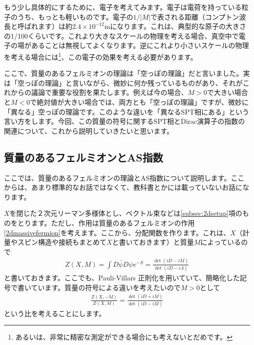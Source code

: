 \documentclass[paper=a4, fontsize=12pt, line_length=16cm, number_of_lines=33,dvipdfmx]{jlreq}
\numberwithin{equation}{section}
\newcommand{\psib}{\bar{\psi}}
\begin{document}
もう少し具体的にするために、電子を考えてみます。電子は電荷を持っている粒子のうち、もっとも軽いものです。電子の$1/|M|$で表される距離（コンプトン波長と呼ばれます）は約$2.4\times 10^{-12}$mになります。これは、典型的な原子の大きさの1/100くらいです。これより大きなスケールの物理を考える場合、真空中で電子の場があることは無視してよくなります。逆にこれより小さいスケールの物理を考える場合には\footnote{あるいは、非常に精密な測定ができる場合にも考えないとだめです。}、この電子の効果を考える必要があります。

ここで、質量のあるフェルミオンの理論は「空っぽの理論」だと言いました。実は「空っぽの理論」と言いながら、微妙に何か残っているものがあり、それがこれからの議論で重要な役割を果たします。例えば今の場合、$M>0$で大きい場合と$M<0$で絶対値が大きい場合では、両方とも「空っぽの理論」ですが、微妙に「異なる」空っぽの理論です。このような違いを「異なるSPT相にある」という言い方をします。今回、この質量の符号に関するSPT相とDirac演算子の指数の関連について、これから説明していきたいと思います。

\subsection{質量のあるフェルミオンとAS指数}\label{subsec:massiveASindex}
ここでは、質量のあるフェルミオンの理論とAS指数について説明します。ここからは、あまり標準的なお話ではなくて、教科書とかには載っていないお話になります。

$X$を閉じた２次元リーマン多様体とし、ベクトル束などは\ref{subsec:2dsetup}項のものをとります。ただし、作用は質量のあるフェルミオンの作用\eqref{2dmassivefermion}を考えます。ここから、分配関数を作ります。これは、$X$（計量やスピン構造や接続もまとめて$X$と書いておきます）と質量$M$によっているので
\begin{align}
  Z(X,M)=\int D\psib D\psi e^{-S}=\frac{\det(iD-iM)}{\det(iD-i\Lambda)}
\end{align}
と書いておきます。ここでも、Pauli-Villars 正則化を用いていて、簡略化した記号で書いています。質量の符号による違いを考えたいので$M>0$として
\begin{align}
  \frac{Z(X,-M)}{Z(X,M)}=\frac{\det(iD+iM)}{\det(iD-iM)}\label{partitionfunctionratio}
\end{align}
という比を考えることにします。
\end{document}
